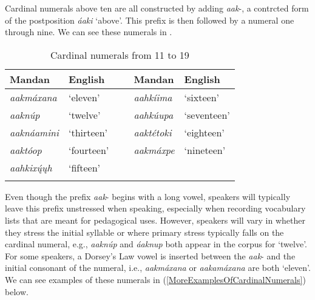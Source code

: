 Cardinal numerals above ten are all constructed by adding \textit{aak}-, a contrcted form of the postposition \textit{áaki} `above'. This prefix is then followed by a numeral one through nine. We can see these numerals in .

\begin{table}
        \caption{Cardinal numerals from 11 to 19}\label{Tab11to19}
    \begin{tabular}{lllll}
\lsptoprule
    \textbf{Mandan}&\textbf{English}& ~&  \textbf{Mandan}&\textbf{English}\\
\midrule
    \textit{aakmáxana}&`eleven'&~&  \textit{aahkíima}&`sixteen'\\
    \textit{aaknúp}&`twelve'&~&     \textit{aahkúupa}&`seventeen'\\
    \textit{aaknáamini}&`thirteen'&~&       
        \textit{aaktétoki}&`eighteen'\\
    \textit{aaktóop}&`fourteen'&~&   \textit{aakmáxpe}&`nineteen'\\
    \textit{aahkixų́ųh}&`fifteen'&~&~&\\\lspbottomrule
    \end{tabular}

\end{table}


Even though the prefix \textit{aak}- begins with a long vowel, speakers will typically leave this prefix unstressed when speaking, especially when recording vocabulary lists that are meant for pedagogical uses. However, speakers will vary in whether they stress the initial syllable or where primary stress typically falls on the cardinal numeral, e.g., \textit{aaknúp} and \textit{áaknup} both appear in the corpus for `twelve'. For some speakers, a Dorsey's Law vowel is inserted between the \textit{aak}- and the initial consonant of the numeral, i.e., \textit{aakmáxana} or \textit{aakamáxana} are both `eleven'. We can see examples of these numerals in (\ref{MoreExamplesOfCardinalNumerals}) below.

